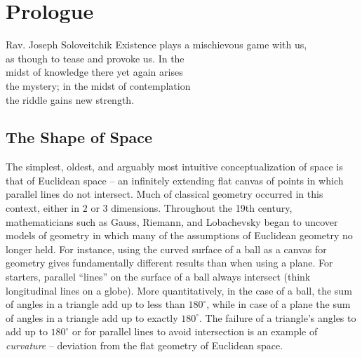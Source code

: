 \chapter*{Prologue}

\begin{epigraph}{19.5em}{Rav. Joseph Soloveitchik}
	Existence plays a mischievous game with us,\\
	as though to tease and provoke us. In the \\
	midst of knowledge there yet again arises \\
	the mystery; in the midst of contemplation\\
	the riddle gains new strength.
\end{epigraph}
%
\section*{The Shape of Space}

The simplest, oldest, and arguably most intuitive conceptualization of space is that of Euclidean space -- an infinitely extending flat canvas of points in which parallel lines do not intersect. Much of classical geometry occurred in this context, either in $2$ or $3$ dimensions.
Throughout the 19th century, mathematicians such as Gauss, Riemann, and Lobachevsky began to uncover models of geometry in which many of the assumptions of Euclidean geometry no longer held.
For instance, using the curved surface of a ball as a canvas for geometry gives fundamentally different results than when using a plane. For starters, parallel ``lines'' on the surface of a ball always intersect (think longitudinal lines on a globe).
More quantitatively, in the case of a ball, the sum of angles in a triangle add up to less than $180^\circ$, while in case of a plane the sum of angles in a triangle add up to exactly $180^\circ$. The failure of a triangle's angles to add up to $180^\circ$ or for parallel lines to avoid intersection is an example of \emph{curvature} -- deviation from the flat geometry of Euclidean space.

